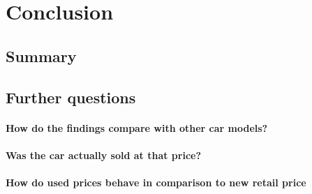 \chapter{Conclusion}
\section{Summary}
\section{Further questions}
\subsubsection{How do the findings compare with other car models?}
\subsubsection{Was the car actually sold at that price?}
\subsubsection{How do used prices behave in comparison to new retail price}